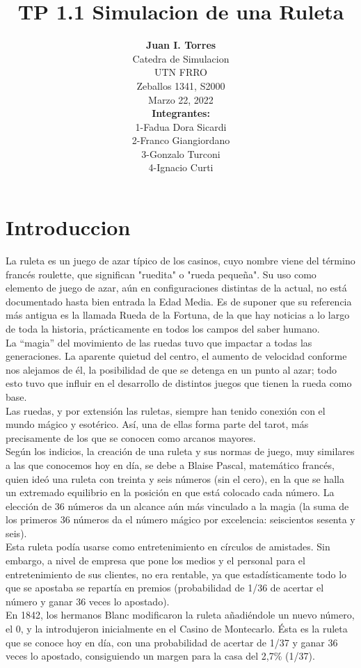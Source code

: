 \documentclass[onecolumn]{article}
\title{TP 1.1 Simulacion de una Ruleta} %
\author{%
\textbf{Juan I. Torres} \\[0.5ex] %
\normalsize Catedra de Simulacion \\ %
\normalsize UTN FRRO \\ %
\normalsize Zeballos 1341, S2000 \\ %
\normalsize Marzo 22, 2022 \\[1.5ex] %
\textbf{Integrantes:} \\  
\normalsize 1-Fadua Dora Sicardi \\
\normalsize 2-Franco Giangiordano \\
\normalsize 3-Gonzalo Turconi \\
\normalsize 4-Ignacio Curti\\
}
\date{}
\begin{document}
\maketitle


\section{Introduccion}

\normalsize La ruleta es un juego de azar típico de los casinos, cuyo nombre viene del término francés roulette, que significan "ruedita" o "rueda pequeña". Su uso como elemento de juego de azar, aún en configuraciones distintas de la actual, no está documentado hasta bien entrada la Edad Media. Es de suponer que su referencia más antigua es la llamada Rueda de la Fortuna, de la que hay noticias a lo largo de toda la historia, prácticamente en todos los campos del saber humano.\\[2ex]
\normalsize La “magia” del movimiento de las ruedas tuvo que impactar a todas las generaciones. La aparente quietud del centro, el aumento de velocidad conforme nos alejamos de él, la posibilidad de que se detenga en un punto al azar; todo esto tuvo que influir en el desarrollo de distintos juegos que tienen la rueda como base.\\[2ex]
\normalsize Las ruedas, y por extensión las ruletas, siempre han tenido conexión con el mundo mágico y esotérico. Así, una de ellas forma parte del tarot, más precisamente de los que se conocen como arcanos mayores.\\[2ex]
\normalsize Según los indicios, la creación de una ruleta y sus normas de juego, muy similares a las que conocemos hoy en día, se debe a Blaise Pascal, matemático francés, quien ideó una ruleta con treinta y seis números (sin el cero), en la que se halla un extremado equilibrio en la posición en que está colocado cada número. La elección de 36 números da un alcance aún más vinculado a la magia (la suma de los primeros 36 números da el número mágico por excelencia: seiscientos sesenta y seis).\\[2ex]
\normalsize Esta ruleta podía usarse como entretenimiento en círculos de amistades. Sin embargo, a nivel de empresa que pone los medios y el personal para el entretenimiento de sus clientes, no era rentable, ya que estadísticamente todo lo que se apostaba se repartía en premios (probabilidad de 1/36 de acertar el número y ganar 36 veces lo apostado).\\[2ex]
\normalsize En 1842, los hermanos Blanc modificaron la ruleta añadiéndole un nuevo número, el 0, y la introdujeron inicialmente en el Casino de Montecarlo. Ésta es la ruleta que se conoce hoy en día, con una probabilidad de acertar de 1/37 y ganar 36 veces lo apostado, consiguiendo un margen para la casa del 2,7\% (1/37).\\[2ex]
\end{document}
